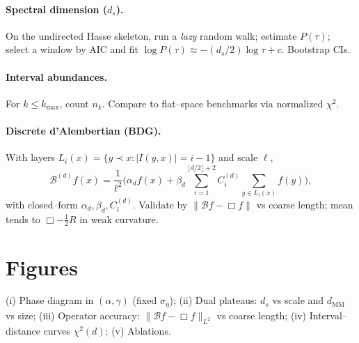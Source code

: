 \documentclass[12pt]{article}
\theoremstyle{definition}
\newcommand{\Boxd}{\mathcal{B}} %
\begin{document}
\paragraph{Spectral dimension (\(d_s\)).} On the undirected Hasse skeleton, run a \emph{lazy} random walk; estimate \(P(\tau)\); select a window by AIC and fit \(\log P(\tau)\approx -(d_s/2)\log\tau+c\). Bootstrap CIs.
\paragraph{Interval abundances.} For \(k\le k_{\max}\), count \(n_k\). Compare to flat--space benchmarks via normalized \(\chi^2\).
\paragraph{Discrete d'Alembertian (BDG).} With layers \(L_i(x)=\{y\prec x: |I(y,x)|=i-1\}\) and scale \(\ell\),
\[
\Boxd^{(d)} f(x)=\frac{1}{\ell^2}\Big(\alpha_d f(x)+\beta_d\sum_{i=1}^{\lfloor d/2\rfloor+2} C_i^{(d)}\sum_{y\in L_i(x)} f(y)\Big),
\]
with closed--form \(\alpha_d,\beta_d,C_i^{(d)}\). Validate by \(\|\Boxd f-\Box f\|\) vs coarse length; mean tends to \(\Box-\tfrac12 R\) in weak curvature.

\section{Figures}
(i) Phase diagram in \((\alpha,\gamma)\) (fixed \(\sigma_\eta\)); (ii) Dual plateaus: \(d_s\) vs scale and \(d_{\mathrm{MM}}\) vs size; (iii) Operator accuracy: \(\|\Boxd f-\Box f\|_{L^2}\) vs coarse length; (iv) Interval--distance curves \(\chi^2(d)\); (v) Ablations.

\appendix
\end{document}
